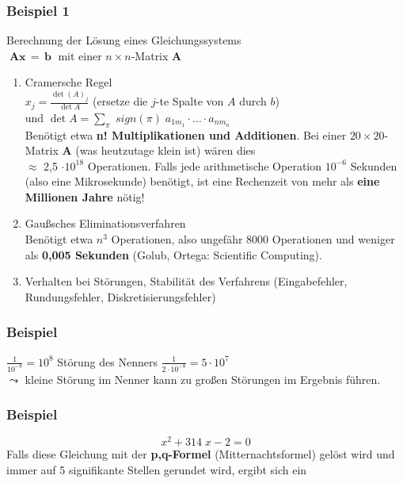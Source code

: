 \documentclass[ngerman,fontsize=11pt, paper=a4, parskip=half, titlepage=true, toc=bib]{scrbook}
\begin{document}
\subsubsection{Beispiel 1}
Berechnung der Lösung eines Gleichungssystems 
\\ $\; \boldsymbol A \boldsymbol x
\, = \, \boldsymbol b \;$ mit einer $n \times n$-Matrix $\boldsymbol A$
\begin{enumerate}
\item Cramersche Regel\\
  $x_j = \frac{\det  (A)_j}{\det A}$ (ersetze die $j$-te
  Spalte von $A$ durch $b$)\\
  und $\det A = \sum_{\pi} \; sign (\pi) \; a_{1 m_1} \cdot \ldots \cdot a_{n
    m_n}$\\
  Benötigt etwa \textbf{n! Multiplikationen und Additionen}.
  Bei einer $20 \times 20$-Matrix $\boldsymbol A$ (was
  heutzutage klein ist) wären dies \\
  $\approx$ 2,5
  $\cdot 10^{18}$ Operationen. Falls jede
  arithmetische Operation $10^{-6}$ Sekunden (also
  eine Mikrosekunde) benötigt, ist eine Rechenzeit
  von mehr als \textbf{eine Millionen Jahre} nötig!
\item Gaußsches Eliminationsverfahren\\
  Benötigt etwa $n^3$ Operationen, also ungefähr
  8000 Operationen und weniger als \textbf{0,005 Sekunden}
  (Golub, Ortega: Scientific Computing).
\item Verhalten bei Störungen, Stabilität des Verfahrens
  (Eingabefehler, Rundungsfehler, Diskretisierungsfehler)\\
\end{enumerate}

\subsubsection{Beispiel}
$\frac{1}{10^{-8}} = 10^8$ Störung des Nenners $\frac{1}{2 \cdot 10^{-8}} = 5 \cdot
10^7$\\
$\leadsto$ kleine Störung im Nenner kann zu großen
Störungen im Ergebnis führen.
\\

\subsubsection{Beispiel}
$$x^2 + 314 \; x - 2 = 0$$
Falls diese Gleichung mit der \textbf{p,q-Formel} (Mitternachtsformel)
 gelöst wird und immer auf 5 signifikante Stellen gerundet wird,
ergibt sich ein
\end{document}
